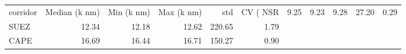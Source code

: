 \begin{tabular}{lrrrrr}
\toprule
corridor &  Median (k nm) &  Min (k nm) &  Max (k nm) &    std &  CV (%
\midrule
     NSR &           9.25 &        9.23 &        9.28 &  27.20 &    0.29 \\
    SUEZ &          12.34 &       12.18 &       12.62 & 220.65 &    1.79 \\
    CAPE &          16.69 &       16.44 &       16.71 & 150.27 &    0.90 \\
\bottomrule
\end{tabular}
